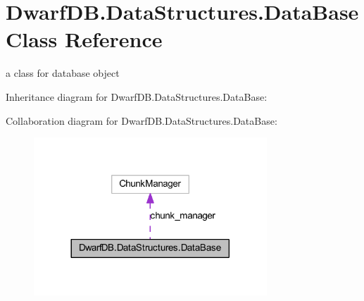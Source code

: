 \hypertarget{class_dwarf_d_b_1_1_data_structures_1_1_data_base}{\section{Dwarf\+D\+B.\+Data\+Structures.\+Data\+Base Class Reference}
\label{class_dwarf_d_b_1_1_data_structures_1_1_data_base}
}


a class for database object  




Inheritance diagram for Dwarf\+D\+B.\+Data\+Structures.\+Data\+Base\+:


Collaboration diagram for Dwarf\+D\+B.\+Data\+Structures.\+Data\+Base\+:
\nopagebreak
\begin{figure}[H]
\begin{center}
\leavevmode
\includegraphics[width=248pt]{class_dwarf_d_b_1_1_data_structures_1_1_data_base__coll__graph}
\end{center}
\end{figure}
